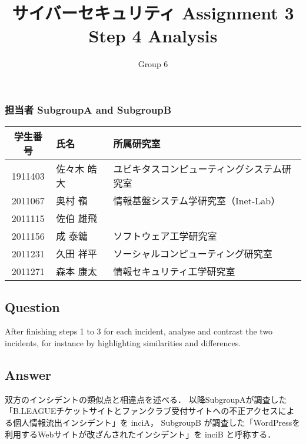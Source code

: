 \documentclass[uplatex]{jsarticle}
\title{
    \vspace{-1.5cm}
    サイバーセキュリティ Assignment 3 \\
    Step 4 Analysis
}
\author{Group 6}
\begin{document}
\maketitle

\subsubsection*{担当者 SubgroupA and SubgroupB}
\begin{table}[H]
    \begin{tabular}{|c|l|l|}
        \hline
        学生番号 & 氏名 & 所属研究室\\
        \hline\hline
        1911403 & 佐々木 皓大 & ユビキタスコンピューティングシステム研究室\\
        \hline
        2011067 & 奥村 嶺 & 情報基盤システム学研究室（Inet-Lab）\\
        \hline
        2011115 & 佐伯 雄飛 & \\
        \hline
        2011156 & 成 泰鏞 & ソフトウェア工学研究室\\
        \hline
        2011231 & 久田 祥平 & ソーシャルコンピューティング研究室\\
        \hline
        2011271 & 森本 康太 & 情報セキュリティ工学研究室\\
        \hline
    \end{tabular}
\end{table}

\subsection*{Question}
After finishing steps 1 to 3 for each incident,
analyse and contrast the two incidents,
for instance by highlighting similarities and differences.
\subsection*{Answer}
双方のインシデントの類似点と相違点を述べる．
以降SubgroupAが調査した「B.LEAGUEチケットサイトとファンクラブ受付サイトへの不正アクセスによる個人情報流出インシデント」を inciA，
SubgroupB が調査した「WordPressを利用するWebサイトが改ざんされたインシデント」を inciB
と呼称する．
\end{document}
